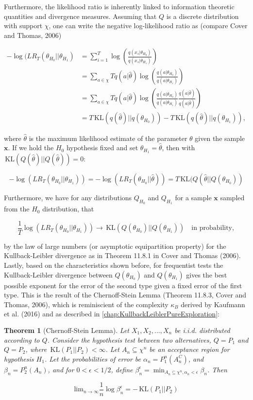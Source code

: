 \documentclass[11pt,]{article}
\newtheorem{theorem}{Theorem}
\newcommand{\KL}{\,\text{KL}}
\begin{document}
Furthermore, the likelihood ratio is inherently linked to information
theoretic quantities and divergence measures. Assuming that \(Q\) is a
discrete distribution with support \(\chi\), one can write the negative
log-likelihood ratio as (compare Cover and Thomas, 2006)

\begin{align*}
-\log(LR_T(\theta_{H_0}|| \theta_{H_1}) & = \sum_{i=1}^T \log(\frac{q(x_s|\theta_{H_0})}{ q(x_s|\theta_{H_1})}) \\
& = \sum_{a \in \chi} T q(a|\hat{\theta}) \log(\frac{q(a|\theta_{H_0})}{ q(a|\theta_{H_1})}) \\
& = \sum_{a \in \chi} T q(a|\hat{\theta}) \log(\frac{q(a|\theta_{H_0})}{ q(a|\theta_{H_1})}\frac{q(a|\hat{\theta})}{ q(a|\hat{\theta})}) \\
& = T \KL(q(\hat{\theta})||q(\theta_{H_0})) - T \KL(q(\hat{\theta})||q(\theta_{H_1})),
\end{align*}

where \(\hat{\theta}\) is the maximum likelihood estimate of the
parameter \(\theta\) given the sample \(\bm{x}\). If we hold the \(H_0\)
hypothesis fixed and set \(\theta_{H_1} = \hat{\theta}\), then with
\(\KL(Q(\hat{\theta})||Q(\hat{\theta})) = 0\):

\[
-\log(LR_T(\theta_{H_0}|| \theta_{H_1})) = -\log(LR_T(\theta_{H_0}|| \hat{\theta})) = T\KL(Q(\hat{\theta}||Q(\theta_{H_0}))
\]

Furthermore, we have for any distributions \(Q_{H_0}\) and \(Q_{H_1}\)
for a sample \(\bm{x}\) sampled from the \(H_0\) distribution, that

\[
\frac{1}{T} \log(LR_T(\theta_{H_0}||\theta_{H_1})) \rightarrow \KL(Q(\theta_{H_0})||Q(\theta_{H_1})) \quad \text{in probability},
\]

by the law of large numbers (or asymptotic equipartition property) for
the Kullback-Leibler divergence as in Theorem 11.8.1 in Cover and Thomas
(2006). Lastly, based on the characteristics shown before, for
frequentist tests the Kullback-Leibler divergence between
\(Q(\theta_{H_0})\) and \(Q(\theta_{H_1})\) gives the best possible
exponent for the error of the second type given a fixed error of the
first type. This is the result of the Chernoff-Stein Lemma (Theorem
11.8.3, Cover and Thomas, 2006), which is reminiscient of the complexity
\(\kappa_B\) derived by Kaufmann et al. (2016) and as described in
\autoref{chap:KullbackLeiblerPureExploration}:

\begin{theorem}[Chernoff-Stein Lemma] \label{theorem:ChernoffStein}
Let $X_1, X_2, ..., X_n$ be i.i.d. distributed according to $Q$. Consider the hypothesis test between two alternatives, $Q=P_1$ and $Q=P_2$, where $\KL(P_1||P_2) < \infty$. Let $A_n \subseteq \chi^n$ be an acceptance region for hypothesis $H_1$. Let the probabilities of error be $\alpha_n = P_1^n(A_n^C)$, and $\beta_n = P_2^n(A_n)$, and for $0< \epsilon <1/2$, define $\beta_n^{\epsilon} = \min_{A_n \subseteq \chi^n, \alpha_n < \epsilon} \beta_n$. Then

$$
\text{lim}_{n\rightarrow \infty} \frac{1}{n} \log \beta_n^{\epsilon} = - \KL(P_1||P_2)
$$
\end{theorem}
\end{document}
